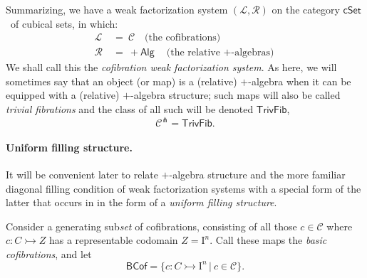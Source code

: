 \documentclass[11pt]{article}
\newcommand{\cSet}{\ensuremath{\mathsf{cSet}}}
\newcommand{\mono}{\ensuremath{\rightarrowtail}}
\newcommand{\I}{\ensuremath{\mathrm{I}}}
\theoremstyle{remark}
\theoremstyle{definition}
\begin{document}
Summarizing, we have a weak factorization system $(\mathcal{L}, \mathcal{R})$ on the category \cSet\ of cubical sets, in which:
\begin{align*}
\mathcal{L}\ &=\ \mathcal{C}\quad \text{(the cofibrations)}\\
\mathcal{R}\ &=\ +\mathsf{Alg}\quad \text{(the relative $+$-algebras)}
\end{align*}
We shall call this the \emph{cofibration weak factorization system}. As here, we will sometimes say that an object (or map) is a (relative) $+$-algebra when it can be equipped with a (relative) $+$-algebra structure; such maps will also be called \emph{trivial fibrations} and the class of all such will be denoted $\mathsf{TrivFib}$,
\[
\mathcal{C}^\pitchfork = \mathsf{TrivFib}.
\]

\paragraph{Uniform filling structure.}

It will be convenient later to relate $+$-algebra structure and the more familiar diagonal filling condition of weak factorization systems with a special form of the latter that occurs in \cite{CCHM} in the form of a \emph{uniform filling structure}. 

Consider a generating sub\emph{set} of cofibrations, consisting of all those $c\in\mathcal{C}$ where $c : C \mono Z$ has a representable codomain $Z=\I^n$.  Call these maps the \emph{basic cofibrations}, and let 
\begin{equation}\label{eq:basiccof}
\mathsf{BCof} = \{c : C\mono \I^n\,|\ c\in \mathcal{C}\}.
\end{equation}
\end{document}
